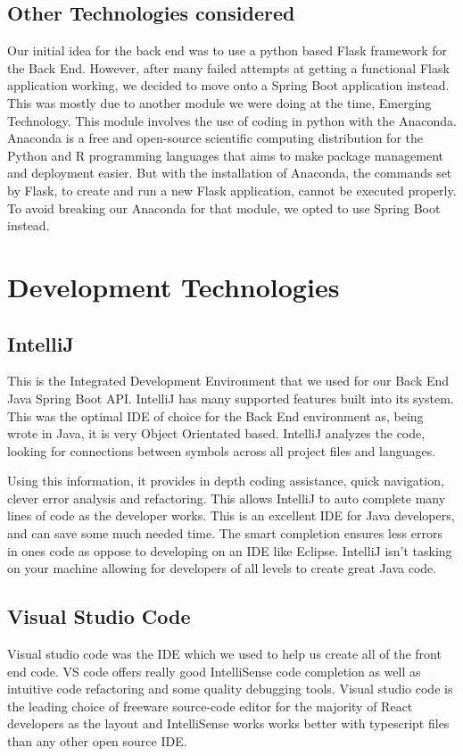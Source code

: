 \subsection{Other Technologies considered}
Our initial idea for the back end was to use a python based Flask framework for the Back End. However, after many failed attempts at getting a functional Flask application working, we decided to move onto a Spring Boot application instead. This was mostly due to another module we were doing at the time, Emerging Technology. This module involves the use of coding in python with the Anaconda. Anaconda is a free and open-source scientific computing distribution for the Python and R programming languages that aims to make package management and deployment easier. But with the installation of Anaconda, the commands set by Flask, to create and run a new Flask application, cannot be executed properly. To avoid breaking our Anaconda for that module, we opted to use Spring Boot instead. 

\section{Development Technologies}

\subsection{IntelliJ}
This is the Integrated Development Environment that we used for our Back End Java Spring Boot API. IntelliJ has many supported features built into its system. This was the optimal IDE of choice for the Back End environment as, being wrote in Java, it is very Object Orientated based. IntelliJ analyzes the code, looking for connections between symbols across all project files and languages.\par
Using this information, it provides in depth coding assistance, quick navigation, clever error analysis and refactoring. This allows IntelliJ to auto complete many lines of code as the developer works. This is an excellent IDE for Java developers, and can save some much needed time. The smart completion ensures less errors in ones code as oppose to developing on an IDE like Eclipse. IntelliJ isn't tasking on your machine allowing for developers of all levels to create great Java code.

\subsection{Visual Studio Code}
Visual studio code was the IDE which we used to help us create all of the front end code. VS code offers really good IntelliSense code completion as well as intuitive code refactoring and some quality debugging tools. Visual studio code is the leading choice of freeware source-code editor for the majority of React developers as the layout and IntelliSense works works better with typescript files than any other open source IDE.

